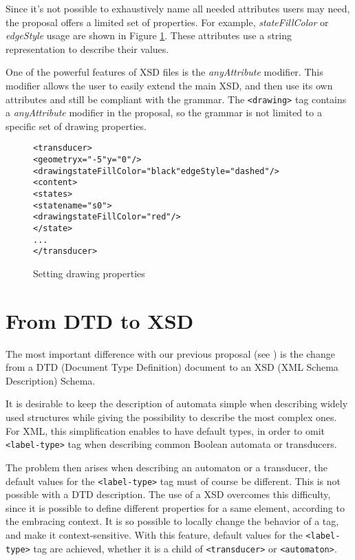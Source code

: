 \documentclass[a4paper]{article}
\def\typetag{\texttt{<label-type>}}
\def\drawingtag{\texttt{<drawing>}}
\def\automatontag{\texttt{<automaton>}}
\def\transducertag{\texttt{<transducer>}}
\begin{document}
Since it's not possible to exhaustively
name all needed attributes users may need, the proposal offers a
limited set of properties. For example, \textit{stateFillColor} or
\textit{edgeStyle} usage are shown in Figure \ref{drawing1}. These
attributes use a string representation to describe their values.

One of the powerful features of XSD files is the
\textit{anyAttribute} modifier. This modifier allows the user to easily
extend the main XSD, and then use its own attributes and still be
compliant with the grammar. The \drawingtag{} tag contains a
\textit{anyAttribute} modifier in the proposal, so the grammar is not
limited to a specific set of drawing properties.

{\small

\begin{figure}[h]
  \begin{center}
\begin{alltt}
<transducer>
  <geometry x="-5" y="0"/>
  <drawing stateFillColor="black" edgeStyle="dashed"/>
  <content>
     <states>
        <state name="s0">
            <drawing stateFillColor="red"/>
        </state>
      ...
</transducer>
\end{alltt}

\caption{Setting drawing properties}
\label{drawing1}
  \end{center}
\end{figure}
}

\section{From DTD to XSD}
The most important difference with our previous proposal (see \cite{VXML04}) is
the change from a DTD (Document Type Definition) document to an XSD (XML Schema
Description) Schema.

It is desirable to keep the description of automata simple when
describing widely used structures while giving the possibility to
describe the most complex ones. For XML, this simplification enables
to have default types, in order to omit \typetag{} tag when
describing common Boolean automata or transducers.

The problem then arises when describing an automaton or a transducer,
the default values for the \typetag{} tag must of course be
different. This is not possible with a DTD description.  The use of a
XSD overcomes this difficulty, since it is possible to define
different properties for a same element, according to the embracing
context. It is so possible to locally change the behavior of a tag, and
make it context-sensitive. With this feature, default values for the
\typetag{} tag are achieved, whether it is a child of
\transducertag{} or \automatontag{}.\\
\end{document}
